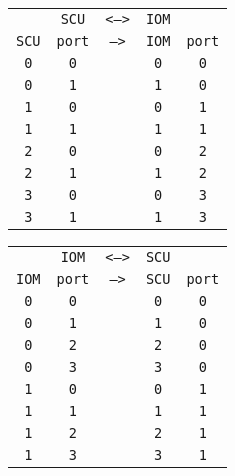 \begin{adjustwidth}{5ex}{1ex}
	\begin{tabular}{ccccc}
		& \texttt{SCU} & \texttt{<-->} & \texttt{IOM} &  \\
		\texttt{SCU} & \texttt{port} & \texttt{-->} & \texttt{IOM} & \texttt{port} \\
		\texttt{0} & \texttt{0} & & \texttt{0} & \texttt{0} \\
		\texttt{0} & \texttt{1} & & \texttt{1} & \texttt{0} \\
		\texttt{1} & \texttt{0} & & \texttt{0} & \texttt{1} \\
		\texttt{1} & \texttt{1} & & \texttt{1} & \texttt{1} \\
		\texttt{2} & \texttt{0} & & \texttt{0} & \texttt{2} \\
		\texttt{2} & \texttt{1} & & \texttt{1} & \texttt{2} \\
		\texttt{3} & \texttt{0} & & \texttt{0} & \texttt{3} \\
		\texttt{3} & \texttt{1} & & \texttt{1} & \texttt{3} \\
	\end{tabular}
\end{adjustwidth}

\begin{adjustwidth}{5ex}{1ex}
	\begin{tabular}{ccccc}
		& \texttt{IOM} & \texttt{<-->} & \texttt{SCU} &  \\
		\texttt{IOM} & \texttt{port} & \texttt{-->} & \texttt{SCU} & \texttt{port} \\
		\texttt{0} & \texttt{0} & & \texttt{0} & \texttt{0} \\
		\texttt{0} & \texttt{1} & & \texttt{1} & \texttt{0} \\
		\texttt{0} & \texttt{2} & & \texttt{2} & \texttt{0} \\
		\texttt{0} & \texttt{3} & & \texttt{3} & \texttt{0} \\
		\texttt{1} & \texttt{0} & & \texttt{0} & \texttt{1} \\
		\texttt{1} & \texttt{1} & & \texttt{1} & \texttt{1} \\
		\texttt{1} & \texttt{2} & & \texttt{2} & \texttt{1} \\
		\texttt{1} & \texttt{3} & & \texttt{3} & \texttt{1} \\
	\end{tabular}
\end{adjustwidth}

